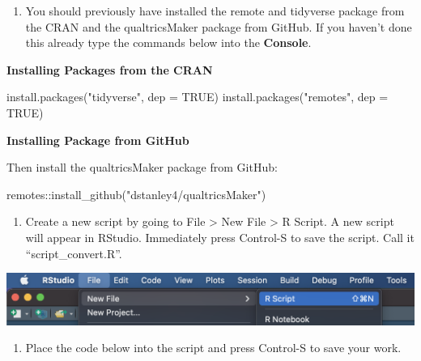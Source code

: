 \documentclass[
]{krantz}
\makeatletter
\newenvironment{Shaded}{\begin{snugshade}}{\end{snugshade}}
\newcommand{\AttributeTok}[1]{\textcolor[rgb]{0.61,0.61,0.61}{#1}}
\newcommand{\ConstantTok}[1]{\textcolor[rgb]{0,0,0}{#1}}
\newcommand{\FunctionTok}[1]{\textcolor[rgb]{0,0,0}{#1}}
\newcommand{\NormalTok}[1]{#1}
\newcommand{\SpecialCharTok}[1]{\textcolor[rgb]{0,0,0}{#1}}
\newcommand{\StringTok}[1]{\textcolor[rgb]{0.5,0.5,0.5}{#1}}
\providecommand{\tightlist}{%
  \setlength{\itemsep}{0pt}\setlength{\parskip}{0pt}}
\newenvironment{kframe}{%
\medskip{}
\setlength{\fboxsep}{.8em}
 \def\at@end@of@kframe{}%
 \ifinner\ifhmode%
  \def\at@end@of@kframe{\end{minipage}}%
  \begin{minipage}{\columnwidth}%
 \fi\fi%
 \def\FrameCommand##1{\hskip\@totalleftmargin \hskip-\fboxsep
 \colorbox{shadecolor}{##1}\hskip-\fboxsep
     \hskip-\linewidth \hskip-\@totalleftmargin \hskip\columnwidth}%
 \MakeFramed {\advance\hsize-\width
   \@totalleftmargin\z@ \linewidth\hsize
   \@setminipage}}%
 {\par\unskip\endMakeFramed%
 \at@end@of@kframe}
\renewenvironment{Shaded}{\begin{kframe}}{\end{kframe}}
\makeatother
\begin{document}
\begin{enumerate}
\def\labelenumi{\arabic{enumi}.}
\setcounter{enumi}{2}
\tightlist
\item
  You should previously have installed the remote and tidyverse package from the CRAN and the qualtricsMaker package from GitHub. If you haven't done this already type the commands below into the \textbf{Console}.
\end{enumerate}

\textbf{Installing Packages from the CRAN}

\begin{Shaded}
\begin{Highlighting}[]
\FunctionTok{install.packages}\NormalTok{(}\StringTok{"tidyverse"}\NormalTok{, }\AttributeTok{dep =} \ConstantTok{TRUE}\NormalTok{)}
\FunctionTok{install.packages}\NormalTok{(}\StringTok{"remotes"}\NormalTok{, }\AttributeTok{dep =} \ConstantTok{TRUE}\NormalTok{)}
\end{Highlighting}
\end{Shaded}

\textbf{Installing Package from GitHub}

Then install the qualtricsMaker package from GitHub:

\begin{Shaded}
\begin{Highlighting}[]
\NormalTok{remotes}\SpecialCharTok{::}\FunctionTok{install\_github}\NormalTok{(}\StringTok{"dstanley4/qualtricsMaker"}\NormalTok{)}
\end{Highlighting}
\end{Shaded}

\begin{enumerate}
\def\labelenumi{\arabic{enumi}.}
\setcounter{enumi}{2}
\tightlist
\item
  Create a new script by going to File \textgreater{} New File \textgreater{} R Script. A new script will appear in RStudio. Immediately press Control-S to save the script. Call it ``script\_convert.R''.
\end{enumerate}

\includegraphics[width=0.5\linewidth]{ch_qualtrics/images/screenshot_new_script}

\begin{enumerate}
\def\labelenumi{\arabic{enumi}.}
\setcounter{enumi}{3}
\tightlist
\item
  Place the code below into the script and press Control-S to save your work.
\end{enumerate}
\end{document}
